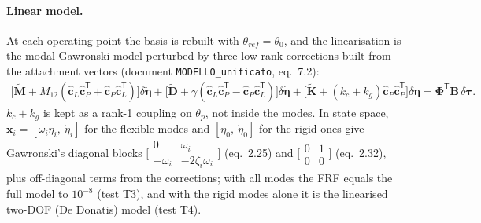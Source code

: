 \documentclass[10pt,a4paper]{article}
\numberwithin{equation}{section}
\begin{document}
\paragraph{Linear model.} At each operating point the basis is rebuilt with $\theta_{ref} = \theta_0$, and the linearisation is the modal Gawronski model perturbed by three low-rank corrections built from the attachment vectors (document \texttt{MODELLO\_unificato}, eq.~7.2):
\begin{gather}
\bigl[\tilde{\mathbf M} + M_{12}(\hat{\mathbf c}_L\hat{\mathbf c}_P^{\mathsf T} + \hat{\mathbf c}_P\hat{\mathbf c}_L^{\mathsf T})\bigr]\delta\ddot{\boldsymbol\eta} + \bigl[\tilde{\mathbf D} + \gamma(\hat{\mathbf c}_L\hat{\mathbf c}_P^{\mathsf T} - \hat{\mathbf c}_P\hat{\mathbf c}_L^{\mathsf T})\bigr]\delta\dot{\boldsymbol\eta} + \bigl[\tilde{\mathbf K} + (k_c + k_g)\hat{\mathbf c}_P\hat{\mathbf c}_P^{\mathsf T}\bigr]\delta\boldsymbol\eta = \boldsymbol\Phi^{\mathsf T}\mathbf B\,\delta\boldsymbol\tau.
\end{gather}
$k_c + k_g$ is kept as a rank-1 coupling on $\theta_p$, not inside the modes. In state space, $\mathbf x_i = [\omega_i\eta_i,\ \dot\eta_i]$ for the flexible modes and $[\eta_0,\ \dot\eta_0]$ for the rigid ones give Gawronski's diagonal blocks $\bigl[\begin{smallmatrix}0 & \omega_i\\ -\omega_i & -2\zeta_i\omega_i\end{smallmatrix}\bigr]$ (eq.~2.25) and $\bigl[\begin{smallmatrix}0 & 1\\ 0 & 0\end{smallmatrix}\bigr]$ (eq.~2.32), plus off-diagonal terms from the corrections; with all modes the FRF equals the full model to $10^{-8}$ (test T3), and with the rigid modes alone it is the linearised two-DOF (De Donatis) model (test T4).
\end{document}
